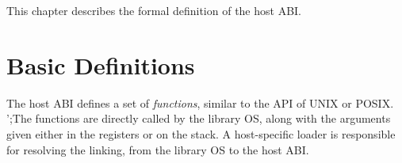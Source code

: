 This chapter describes the formal definition of the \graphene{} host ABI.

\section{Basic Definitions}

The \graphene{} host ABI defines a set of {\em functions}, similar to the API of UNIX or POSIX.
';The functions are directly called by the library OS, along with the arguments given either in the registers or on the stack.
A host-specific \graphene{} loader is responsible for resolving the linking, from the library OS to the host ABI.